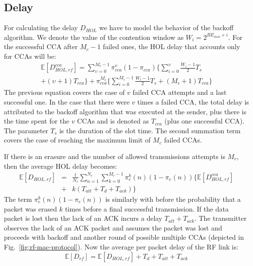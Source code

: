 \documentclass[10pt]{IEEEtran}
\newcounter{section:outage-analysis}
\begin{document}
\subsection{Delay}
For calculating the delay $D_{HOL}$ we have to model the behavior of the backoff algorithm. We denote the value of the contention window as $W_i=2^{BE_{min}+i}$. For the successful CCA after $M_c-1$ failed ones, the HOL delay that accounts only for CCAs will be:
\begin{eqnarray}\label{D_cca}
\mathbb{E}[D^{cca}_{HOL,rf}] = \sum_{\upsilon=0}^{M_c-1}\pi_{cca}^{v}(1-\pi_{cca}) \Big \{ \sum_{i=0}^{\upsilon}\frac{W_i-1}{2} T_{s}\nonumber\\
    +(\upsilon+1) T_{cca} \Big \}
    +\pi^{M_c}_{cca} \Big \{ \sum_{i=0}^{M_c-1}\frac{W_i-1}{2} T_{s}+(M_c+1) T_{cca} \Big \}
\end{eqnarray}
The previous equation covers the case of $v$ failed CCA attempts and a last successful one.  In the case that there were $v$ times a failed CCA, the total delay is attributed to the backoff algorithm that was executed at the sender, plus there is the time spent for the $v$ CCAs and is denoted as $T_{cca}$ (plus one successful CCA). The parameter $T_{s}$ is the duration of the slot time. The second summation term covers the case of reaching the maximum limit of $M_c$ failed CCAs.

If there is an erasure and the number of allowed transmissions attempts is $M_r$, then the average HOL delay becomes:
\begin{eqnarray}\label{D_e}
\mathbb{E}[D_{HOL,rf}]&=&\frac{1}{N_r}\sum_{n=1}^{N_r}\sum_{k=0}^{M_r-1}\pi_{e}^{k}(n)(1-\pi_{e}(n))  \{ \mathbb{E}[D^{cca}_{HOL,rf}] \nonumber\\
&+&k (T_{att}+T_{d}+T_{ack})  \}
\end{eqnarray}
The term $\pi_{e}^{k}(n)(1-\pi_{e}(n))$ is similarly with before the probability that a packet was erased $k$ times before a final successful transmission. If the data packet is lost then the lack of an ACK incurs a delay $T_{att}+T_{ack}$. The transmitter observes the lack of an ACK packet and assumes the packet was lost and proceeds with backoff and another round of possible multiple CCAs (depicted in Fig.~\ref{fig:rf-mac-protocol}). Now the average per packet delay of the RF link is:
\begin{equation}\label{D}
    \mathbb{E}[{D}_{rf}]=\mathbb{E}[D_{HOL,rf}]+ T_{d} +T_{att} + T_{ack}
\end{equation}
\end{document}
